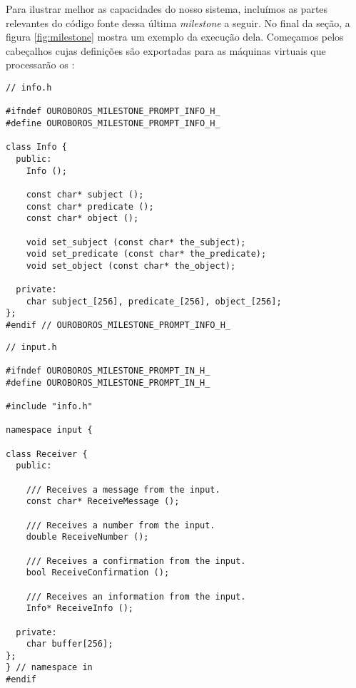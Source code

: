 Para ilustrar melhor as capacidades do nosso sistema, incluímos as
partes relevantes do código fonte dessa última \textit{milestone}
a seguir. No final da seção, a figura \ref{fig:milestone} mostra
um exemplo da execução dela. Começamos pelos cabeçalhos cujas
definições são exportadas para as máquinas virtuais que processarão os :

\vspace{1em}
\begin{lstlisting}
// info.h

#ifndef OUROBOROS_MILESTONE_PROMPT_INFO_H_
#define OUROBOROS_MILESTONE_PROMPT_INFO_H_

class Info {
  public:
    Info ();

    const char* subject ();
    const char* predicate ();
    const char* object ();

    void set_subject (const char* the_subject);
    void set_predicate (const char* the_predicate);
    void set_object (const char* the_object);

  private:
    char subject_[256], predicate_[256], object_[256];
};
#endif // OUROBOROS_MILESTONE_PROMPT_INFO_H_
\end{lstlisting}
\vspace{1em}
\begin{lstlisting}
// input.h  

#ifndef OUROBOROS_MILESTONE_PROMPT_IN_H_
#define OUROBOROS_MILESTONE_PROMPT_IN_H_

#include "info.h"

namespace input {

class Receiver {
  public:

    /// Receives a message from the input.
    const char* ReceiveMessage ();
    
    /// Receives a number from the input.
    double ReceiveNumber ();
    
    /// Receives a confirmation from the input.
    bool ReceiveConfirmation ();

    /// Receives an information from the input.
    Info* ReceiveInfo ();

  private:
    char buffer[256];
};
} // namespace in
#endif
\end{lstlisting}

